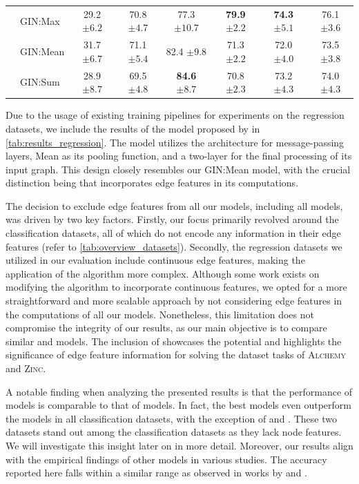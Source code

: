 \begin{table}[!b]
{\begin{tabular}{@{}c <{\enspace}@{}lcccccc@{}}
			& \textsf{GIN:Max} & 29.2 \scriptsize $\pm 6.2$	& 70.8 \scriptsize $\pm 4.7$ & 77.3 \scriptsize $\pm 10.7$ & \textbf{79.9} \scriptsize $\pm 2.2$ & \textbf{74.3} \scriptsize $\pm 5.1$ & 76.1 \scriptsize $\pm 3.6$  
			\\ 
			& \textsf{GIN:Mean}  & 31.7 \scriptsize $\pm 6.7$	& 71.1 \scriptsize $\pm 5.4$ & 82.4 \scriptsize $\pm 9.8$ & 71.3 \scriptsize $\pm 2.2$	 & 72.0 \scriptsize $\pm 4.0$ & 73.5 \scriptsize $\pm 3.8$
			\\ 
			& \textsf{GIN:Sum} & 28.9 \scriptsize $\pm 8.7$ & 	69.5 \scriptsize $\pm 4.8$	& \textbf{84.6} \scriptsize $\pm 8.7$ & 70.8 \scriptsize $\pm 2.3$ & 73.2 \scriptsize $\pm 4.3$	 & 74.0 \scriptsize $\pm 4.3$
			\\
			\bottomrule
	\end{tabular}}         
\end{table}

Due to the usage of existing training pipelines for experiments on the regression datasets, we include the results of the \gineeps model proposed by \cite{Mor+2020} in \cref{tab:results_regression}. The \gineeps model utilizes the \gin architecture for message-passing layers, \textsf{Mean} as its pooling function, and a two-layer \mlp for the final processing of its input graph. This design closely resembles our \textsf{GIN:Mean} model, with the crucial distinction being that \gineeps incorporates edge features in its computations.

The decision to exclude edge features from all our models, including all \wlnn models, was driven by two key factors. Firstly, our focus primarily revolved around the classification datasets, all of which do not encode any information in their edge features (refer to \cref{tab:overview_datasets}). Secondly, the regression datasets we utilized in our evaluation include continuous edge features, making the application of the \wl algorithm more complex. Although some work exists on modifying the \wl algorithm to incorporate continuous features, we opted for a more straightforward and more scalable approach by not considering edge features in the computations of all our models. Nonetheless, this limitation does not compromise the integrity of our results, as our main objective is to compare similar \gnn and \wlnn models. The inclusion of \gineeps showcases the potential and highlights the significance of edge feature information for solving the dataset tasks of \textsc{Alchemy} and \textsc{Zinc}.

A notable finding when analyzing the presented results is that the performance of \wlnn models is comparable to that of \gnn models. In fact, the best \wlnn models even outperform the \gnn models in all classification datasets, with the exception of \imdb and \reddit. These two datasets stand out among the classification datasets as they lack node features. We will investigate this insight later on in more detail. 
Moreover, our results align with the empirical findings of other \gnn models in various studies. The accuracy reported here falls within a similar range as observed in works by \cite{Xu2018,Morris2022,Mor+2020} and \cite{Zhang2018}. 

